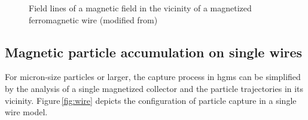 \begin{figure}[H]
\centering
{}
\caption[Magnetic field in the vicinity of a wire]{Field lines of a magnetic field in the vicinity of a magnetized ferromagnetic wire (modified from\cite{FranzrebHabil})
\label{fig:mag_field_wire}
}
\end{figure}


\subsection{Magnetic particle accumulation on single wires}
\label{subsec:single_wire}
For micron-size particles or larger, the capture process in \gls{hgms} can be simplified by the analysis of a single magnetized collector and the particle trajectories in its vicinity. Figure\,\ref{fig:wire} depicts the configuration of particle capture in a single wire model.

